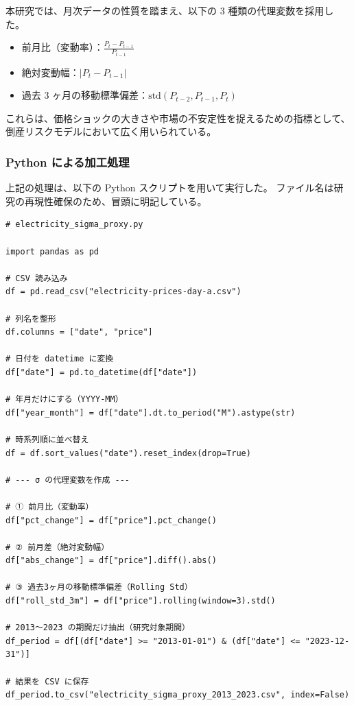 本研究では、月次データの性質を踏まえ、以下の 3 種類の代理変数を採用した。

\begin{itemize}
  \item 前月比（変動率）：$\displaystyle \frac{P_t - P_{t-1}}{P_{t-1}}$
  \item 絶対変動幅：$\displaystyle |P_t - P_{t-1}|$
  \item 過去 3 ヶ月の移動標準偏差：$\mathrm{std}(P_{t-2}, P_{t-1}, P_t)$
\end{itemize}

これらは、価格ショックの大きさや市場の不安定性を捉えるための指標として、
倒産リスクモデルにおいて広く用いられている。

\subsubsection*{Python による加工処理}

上記の処理は、以下の Python スクリプトを用いて実行した。
ファイル名は研究の再現性確保のため、冒頭に明記している。

\begin{verbatim}
# electricity_sigma_proxy.py

import pandas as pd

# CSV 読み込み
df = pd.read_csv("electricity-prices-day-a.csv")

# 列名を整形
df.columns = ["date", "price"]

# 日付を datetime に変換
df["date"] = pd.to_datetime(df["date"])

# 年月だけにする（YYYY-MM）
df["year_month"] = df["date"].dt.to_period("M").astype(str)

# 時系列順に並べ替え
df = df.sort_values("date").reset_index(drop=True)

# --- σ の代理変数を作成 ---

# ① 前月比（変動率）
df["pct_change"] = df["price"].pct_change()

# ② 前月差（絶対変動幅）
df["abs_change"] = df["price"].diff().abs()

# ③ 過去3ヶ月の移動標準偏差（Rolling Std）
df["roll_std_3m"] = df["price"].rolling(window=3).std()

# 2013〜2023 の期間だけ抽出（研究対象期間）
df_period = df[(df["date"] >= "2013-01-01") & (df["date"] <= "2023-12-31")]

# 結果を CSV に保存
df_period.to_csv("electricity_sigma_proxy_2013_2023.csv", index=False)
\end{verbatim}

